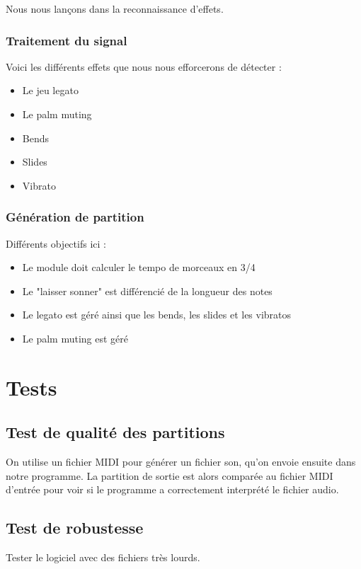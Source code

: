 \documentclass[12pt]{article}
\begin{document}
Nous nous lançons dans la reconnaissance d'effets.

\subsubsection{Traitement du signal}

Voici les différents effets que nous nous efforcerons de détecter :
\begin{itemize}
\item Le jeu legato
\item Le palm muting
\item Bends
\item Slides
\item Vibrato
\end{itemize}

\subsubsection{Génération de partition}

Différents objectifs ici :

\begin{itemize}
\item Le module doit calculer le tempo de morceaux en 3/4
\item Le "laisser sonner" est différencié de la longueur des notes
\item Le legato est géré ainsi que les bends, les slides et les vibratos
\item Le palm muting est géré
\end{itemize}

\newpage
\section{Tests}

\subsection{Test de qualité des partitions}
On utilise un fichier MIDI pour générer un fichier son, qu’on envoie ensuite dans notre programme. La partition de sortie est alors comparée au fichier MIDI d’entrée pour voir si le programme a correctement interprété le fichier audio.\\

\subsection{Test de robustesse}
Tester le logiciel avec des fichiers très lourds.
\end{document}
